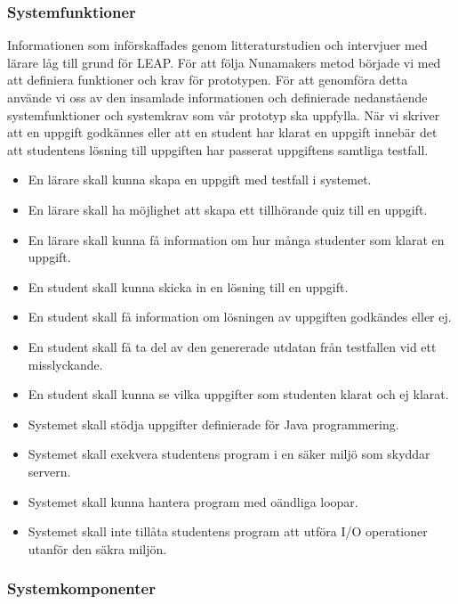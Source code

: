 \documentclass[a4paper,11pt]{article}
\begin{document}
{\subsubsection{Systemfunktioner} \label{systemfunktioner}
Informationen som införskaffades genom litteraturstudien och intervjuer med lärare låg till grund för LEAP. För att följa Nunamakers metod började vi med att definiera funktioner och krav för prototypen. För att genomföra detta använde vi oss av den insamlade informationen och definierade nedanstående systemfunktioner och systemkrav som vår prototyp ska uppfylla. När vi skriver att en uppgift godkännes eller att en student har klarat en uppgift innebär det att studentens lösning till uppgiften har passerat uppgiftens samtliga testfall.

\begin{itemize}
\item
En lärare skall kunna skapa en uppgift med testfall i systemet.
\item
En lärare skall ha möjlighet att skapa ett tillhörande quiz till en uppgift.
\item
En lärare skall kunna få information om hur många studenter som klarat en uppgift.
\item
En student skall kunna skicka in en lösning till en uppgift.
\item
En student skall få information om lösningen av uppgiften godkändes eller ej.
\item
En student skall få ta del av den genererade utdatan från testfallen vid ett misslyckande.
\item
En student skall kunna se vilka uppgifter som studenten klarat och ej klarat.
\item
Systemet skall stödja uppgifter definierade för Java programmering.
\item
Systemet skall exekvera studentens program i en säker miljö som skyddar servern.
\item
Systemet skall kunna hantera program med oändliga loopar.
\item
Systemet skall inte tillåta studentens program att utföra I/O operationer utanför den säkra miljön.
\end{itemize}

\subsubsection{Systemkomponenter} \label{systemkomponenter}

}
\end{document}
